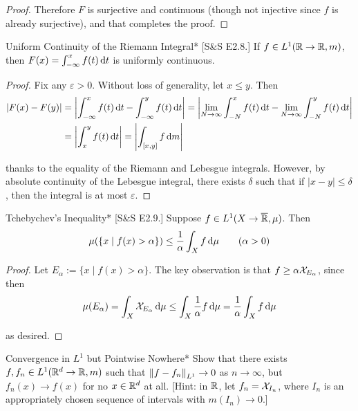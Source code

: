 \begin{proof}
    Therefore \(F\) is surjective and continuous (though not injective since \(f\) is already surjective), and that completes the proof. 
\end{proof}

\begin{problem}{Uniform Continuity of the Riemann Integral}*
    [S\&S E2.8.] If \(f \in L^1(\mathbb{R} \to \mathbb{R}, m)\), then \(F(x) = \int_{-\infty}^x f(t) \, \mathrm{d}t\) is uniformly continuous.
\end{problem}

\begin{proof}
    Fix any \(\varepsilon > 0\). Without loss of generality, let \(x \leq y\). Then
    \begin{align*}
        |F(x) - F(y)| 
        &= \left| \int_{-\infty}^x f(t) \, \mathrm{d}t - \int_{-\infty}^y f(t) \, \mathrm{d}t \right| 
        = \left| \lim_{N \to \infty} \int_{-N}^x f(t) \,\mathrm{d}t - \lim_{N \to \infty} \int_{-N}^y f(t) \, \mathrm{d}t \right|  \\
        &= \left| \int_x^y f(t) \, \mathrm{d}t \right| 
        = \left| \int_{[x, y]} f \, \mathrm{d} m \right| 
    \end{align*}

    thanks to the equality of the Riemann and Lebesgue integrals. However, by absolute continuity of the Lebesgue integral, there exists \(\delta\) such that if \(|x - y| \leq \delta\), then the integral is at most \(\varepsilon\).
\end{proof}

\begin{problem}{Tchebychev's Inequality}*
    [S\&S E2.9.] Suppose \(f \in L^1(X \to \overline{\mathbb{R}}, \mu)\). Then
    \[
    \mu(\{x \mid f(x) > \alpha\}) \leq \frac{1}{\alpha} \int_{X} f \, \mathrm{d}\mu \qquad (\alpha > 0)
    \]
\end{problem}

\begin{proof}
    Let \(E_{\alpha} := \{x \mid f(x) > \alpha\}\). The key observation is that \(f \geq \alpha \mathcal{X}_{E_\alpha}\), since then
    \[
        \mu(E_\alpha) = \int_X \mathcal{X}_{E_\alpha} \, \mathrm{d}\mu 
        \leq \int_X \frac{1}{\alpha} f \, \mathrm{d} \mu 
        = \frac{1}{\alpha} \int_X f \, \mathrm{d} \mu
    \]

    as desired. 
\end{proof}

\begin{problem}{Convergence in \(L^1\) but Pointwise Nowhere}*
    Show that there exists \(f, f_n \in L^1(\mathbb{R}^d \to \mathbb{R}, m)\) such that \(\norm{f - f_n}_{L^1} \to 0\) as \(n \to \infty\), but \(f_n(x) \to f(x)\) for no \(x \in \mathbb{R}^d\) at all. [Hint: in \(\mathbb{R}\), let \(f_n = \mathcal{X}_{I_n}\), where \(I_n\) is an appropriately chosen sequence of intervals with \(m(I_n) \to 0\).]
\end{problem}

